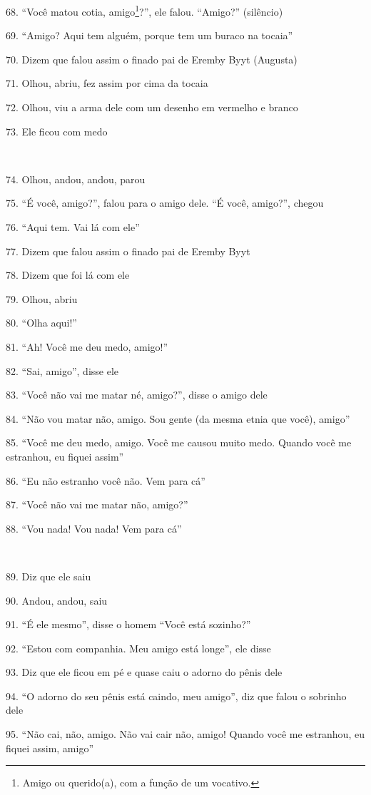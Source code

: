 68. ``Você matou cotia, amigo\footnote{Amigo ou querido(a), com a função
  de um vocativo.}?'', ele falou. ``Amigo?'' (silêncio)

69. ``Amigo? Aqui tem alguém, porque tem um buraco na tocaia''

70. Dizem que falou assim o finado pai de Eremby Byyt (Augusta)

71. Olhou, abriu, fez assim por cima da tocaia

72. Olhou, viu a arma dele com um desenho em vermelho e branco

73. Ele ficou com medo

~

74. Olhou, andou, andou, parou

75. ``É você, amigo?'', falou para o amigo dele. ``É você, amigo?'', chegou

76. ``Aqui tem.  Vai lá com ele''

77. Dizem que falou assim o finado pai de Eremby Byyt

78. Dizem que foi lá com ele

79. Olhou, abriu

80. ``Olha aqui!''

81. ``Ah! Você me deu medo, amigo!''

82. ``Sai, amigo'', disse ele

83. ``Você não vai me matar né, amigo?'', disse o amigo dele

84. ``Não vou matar não, amigo. Sou gente (da mesma etnia que você), amigo''

85. ``Você me deu medo, amigo. Você me causou muito medo. Quando você me
estranhou, eu fiquei assim''

86. ``Eu não estranho você não. Vem para cá''

87. ``Você não vai me matar não, amigo?''

88. ``Vou nada! Vou nada! Vem para cá''

~

89. Diz que ele saiu

90. Andou, andou, saiu

91. ``É ele mesmo'', disse o homem ``Você está sozinho?''

92. ``Estou com companhia. Meu amigo está longe'', ele disse

93. Diz que ele ficou em pé e quase caiu o adorno do pênis dele

94. ``O adorno do seu pênis está caindo, meu amigo'', diz que falou o
sobrinho dele

95. ``Não cai, não, amigo. Não vai cair não, amigo! Quando você me
estranhou, eu fiquei assim, amigo''

